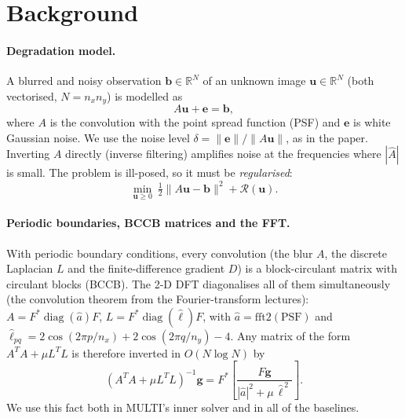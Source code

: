 \section{Background}
\label{sec:background}

\paragraph{Degradation model.}
A blurred and noisy observation $\mathbf b\in\mathbb R^N$ of an unknown image
$\mathbf u\in\mathbb R^N$ (both vectorised, $N=n_x n_y$) is modelled as
\begin{equation}
  A\mathbf u + \mathbf e = \mathbf b ,
  \label{eq:model}
\end{equation}
where $A$ is the convolution with the point spread function (PSF) and $\mathbf e$
is white Gaussian noise. We use the noise level $\delta=\|\mathbf e\|/\|A\mathbf u\|$,
as in the paper. Inverting $A$ directly (inverse filtering) amplifies noise at the
frequencies where $|\hat A|$ is small. The problem is ill-posed, so it must be
\emph{regularised}:
\begin{equation}
  \min_{\mathbf u\ge 0}\ \tfrac12\|A\mathbf u-\mathbf b\|^2 + \mathcal R(\mathbf u).
  \label{eq:variational}
\end{equation}

\paragraph{Periodic boundaries, BCCB matrices and the FFT.}
With periodic boundary conditions, every convolution (the blur $A$, the discrete
Laplacian $L$ and the finite-difference gradient $D$) is a block-circulant
matrix with circulant blocks (BCCB). The 2-D DFT diagonalises all of them
simultaneously (the convolution theorem from the Fourier-transform lectures):
$A=F^{*}\operatorname{diag}(\hat a)F$, $L=F^{*}\operatorname{diag}(\hat\ell)F$, with
$\hat a=\mathrm{fft2}(\text{PSF})$ and
$\hat\ell_{pq}=2\cos(2\pi p/n_x)+2\cos(2\pi q/n_y)-4$.
Any matrix of the form $A^TA+\mu L^TL$ is therefore inverted in $O(N\log N)$ by
\[
(A^TA+\mu L^TL)^{-1}\mathbf g
  = F^{*}\!\left[\frac{F\mathbf g}{|\hat a|^2+\mu\,\hat\ell^{\,2}}\right].
\]
We use this fact both in MULTI's inner solver and in all of the baselines.

